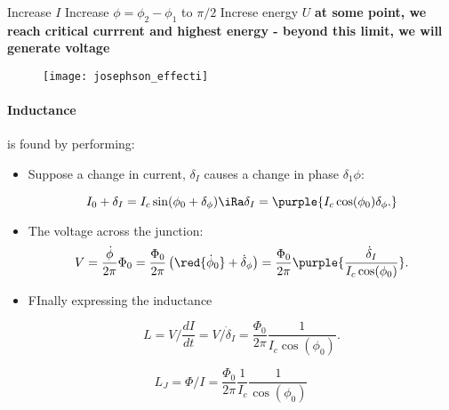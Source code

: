   \begin{center}
    Increase  $  I $  \ira  Increase  $  \phi  = \phi_2-\phi_1  $  to
    $ \pi/2 $  \ira Increse energy $ U $  \ira \textbf{at some point,
      we reach  critical currrent  and highest  energy -  beyond this
      limit, we will generate voltage}


\begin{figure}[h]
  \centering \texttt{[image: josephson\_effecti]}
\end{figure}

\noindent
\end{center}

\paragraph{Inductance} is found by performing:

\begin{itemize}
\item Suppose  a change in current,  $ \delta_I $ causes  a change in
  phase $ \delta_1\phi $:

    \begin{equation}
      I_0 + \delta_I = I_c\sin(\phi_0+\delta_\phi) \iRa \delta_I = \purple{I_c\cos(\phi_0)\delta_\phi.}
    \end{equation}
  \item The voltage across the junction:
    \begin{equation}
      V = \frac{\dot{\phi}}{2\pi}\Phi_0 = \frac{\Phi_0}{2\pi}\left(\red{\dot{\phi}_0} + \dot{\delta}_\phi\right) =  \frac{\Phi_0}{2\pi}\purple{\frac{\dot{\delta}_I}{I_c\cos(\phi_0)}}.
    \end{equation}

  \item FInally expressing the inductance

    \begin{equation}
      L = V/\frac{dI}{dt} = V/\dot{\delta}_I = \frac{\Phi_0}{2\pi}\frac{1}{I_c\cos(\phi_0)}.
    \end{equation}
  \end{itemize}

  \begin{framed}\noindent
    \begin{equation}\label{eq:jj-inductance}
      L_J = \Phi/I =
      \frac{\Phi_0}{2\pi}\frac{1}{I_c}\frac{1}{\cos(\phi_0)}
    \end{equation}
  \end{framed}

